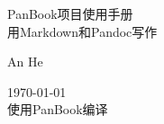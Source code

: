 \documentclass{ctexbook}
\newlength{\drop}
\begin{document}
  \begin{titlepage}
    \thispagestyle{empty}
    \noindent\fboxsep=0pt

    \centering
	\vspace{.18\textheight}
    {\Huge PanBook项目使用手册}\\[0.2\baselineskip]
	\vspace{1cm}
	{\Large 用Markdown和Pandoc写作}
	\par
    \vspace*{3cm}
    {\Large An He\par}
    \vfill
    {\scshape \today} \\
    {\small 使用PanBook编译}\par
  \end{titlepage}
\end{document}
